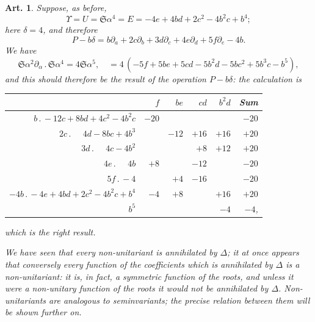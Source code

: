 \documentclass[11pt,a4paper]{article}
\theoremstyle{cayley}
\newtheorem{art}{Art.}[section]
\begin{document}
\setcounter{art}{25}
\begin{art}
Suppose, as before,
\[
\Upsilon = U = \mathfrak{S}\alpha^{4} = E = -4e + 4bd + 2c^{2} - 4b^{2}c + b^{4};
\]
here $\delta = 4$, and therefore
\[
P - b\delta = b\partial_{a} + 2c\partial_{b} + 3d\partial_{c} + 4e\partial_{d} + 5f\partial_{e} - 4b.
\]
We have
\[
\mathfrak{S}\alpha^{2}\partial_{\alpha}\,.\,\mathfrak{S}\alpha^{4} = 4\mathfrak{S}\alpha^{5},\quad = 4\,(-5f + 5be + 5cd - 5b^{2}d - 5bc^{2} + 5b^{3}c - b^{5}),
\]
and this should therefore be the result of the operation $P - b\delta$: the calculation is
\begin{center}
\begin{tabular}{r|rrrr|r}
 & $f$ & $be$ & $cd$ & $b^{2}d$ & Sum \\
\hline
$b\,.\,-12c + 8bd + 4c^{2} - 4b^{2}c$ & $-20$ & & & & $-20$ \\
$2c\,.\,\phantom{+}4d - 8bc + 4b^{3}$ & & $-12$ & $+16$ & $+16$ & $+20$ \\
$3d\,.\,\phantom{+}4c - 4b^{2}$ & & & $+8$ & $+12$ & $+20$ \\
$4e\,.\,\phantom{+}4b$ & $+8$ & & $-12$ & & $-20$ \\
$5f\,.\,-4$ & & $+4$ & $-16$ & & $-20$ \\
$-4b\,.\,-4e + 4bd + 2c^{2} - 4b^{2}c + b^{4}$ & $-4$ & $+8$ & & $+16$ & $+20$ \\
$b^{5}$ & & & & $-4$ & $-4$,
\end{tabular}
\end{center}
which is the right result.

We have seen that every non-unitariant is annihilated by $\Delta$; it at once appears that conversely every function of the coefficients which is annihilated by $\Delta$ is a non-unitariant: it is, in fact, a symmetric function of the roots, and unless it were a non-unitary function of the roots it would not be annihilated by $\Delta$. Non-unitariants are analogous to seminvariants; the precise relation between them will be shown further on.
\end{art}
\end{document}
